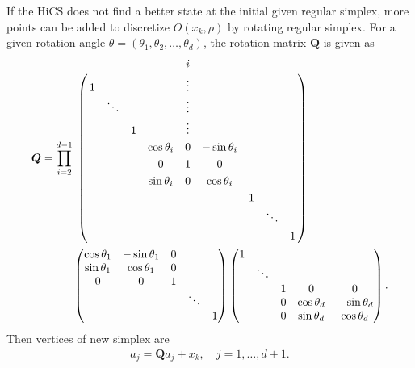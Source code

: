 \documentclass[mathpazo]{csam}
\theoremstyle{remark}
\begin{document}
If the HiCS does not find a better state at the initial given regular simplex,
more points can be added to discretize $O(x_k, \rho)$ by rotating regular
simplex. For a given rotation angle $\theta=(\theta_1,\theta_2,\dots,\theta_{d})$, 
the rotation matrix $\bm Q$ is given as 
\begin{equation}
\begin{aligned}
	{\bm Q} = 
	 \prod_{i=2}^{d-1} &
\bordermatrix{
  &  &       &  & 		   & i &		   &  &  & \cr
  & 1&       &  & 		   & \vdots  & 		   &  &  &  \cr
  &  & \ddots&  & 		   & \vdots  & 		   &  &  &  \cr
  &  &       & 1&          & \vdots  & 		   &  &  &  \cr
  &  &       &  & \cos \theta_i & 0 & -\sin \theta_i &  &  &  \cr
  &  &       &  &   0	 & 1 &     0     &  &  & \cr 
  &  &       &  & \sin \theta_i & 0 &  \cos \theta_i &  &  &  \cr
  &  &       &  &          &   &           & 1 & &  \cr
  &  &       &  &          &   &           &  & \ddots &   \cr
  &  &       &  &          &   &           &  &  & 1 
}
\\
	& \begin{pmatrix}
  \cos \theta_1 & -\sin \theta_1 & 0 &  		&   \\
  \sin \theta_1 & \cos \theta_1  & 0 & 	 	& 	\\
  	0	   &      0    & 1 & 		&   \\
  		   & 		   &   & \ddots &   \\
  		   & 		   &   &   		& 1 
	\end{pmatrix}
	\begin{pmatrix}
  1 &  &  &  		&   \\
    & \ddots  &  & 	 	& 	\\
    &    & 1 & 	0	& 0  \\
    &    & 0 & \cos\theta_d & -\sin\theta_d  \\
    & 	 & 0 &  \sin\theta_d & \cos\theta_d 
	\end{pmatrix}.
\end{aligned}
	\label{}
\end{equation}
Then vertices of new simplex are
\begin{align}
	a_j = \bm{Q}a_j + x_k, \quad j = 1,\dots, d+1.
	\label{}
\end{align}
\end{document}
